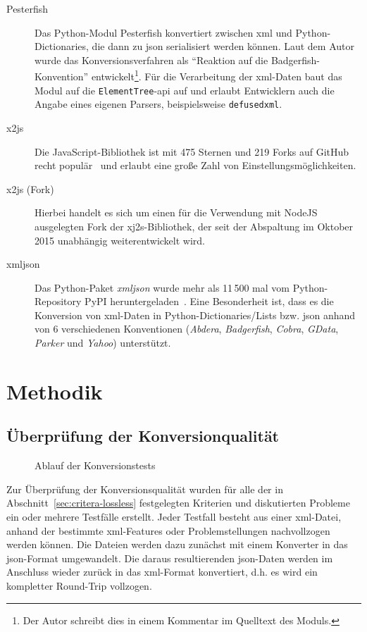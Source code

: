 \begin{description}
    \item[Pesterfish] Das Python-Modul Pesterfish konvertiert zwischen \acrshort{xml} und Python-\linebreak{}Dictionaries, die dann zu \acrshort{json} serialisiert werden können. Laut dem Autor wurde das Konversionsverfahren als \enquote{Reaktion auf die Badgerfish-Konvention} entwickelt\footnote{Der Autor schreibt dies in einem Kommentar im Quelltext des Moduls.}. Für die Verarbeitung der \acrshort{xml}-Daten baut das Modul auf die \texttt{ElementTree}-\acrshort{api} auf und erlaubt Entwicklern auch die Angabe eines eigenen Parsers, beispielsweise \texttt{defusedxml}.
    \item[x2js] Die JavaScript-Bibliothek ist mit 475 Sternen und 219 Forks auf GitHub recht populär~\cite{githubx2js} und erlaubt eine große Zahl von Einstellungsmöglichkeiten.
    \item[x2js (Fork)] Hierbei handelt es sich um einen für die Verwendung mit NodeJS ausgelegten Fork der xj2s-Bibliothek, der seit der Abspaltung im Oktober 2015 unabhängig weiterentwickelt wird.
    \item[xmljson] Das Python-Paket \emph{xmljson} wurde mehr als 11\,500 mal vom Python-Repository PyPI heruntergeladen~\cite{pypistats-xmljson}. Eine Besonderheit ist, dass es die Konversion von \acrshort{xml}-Daten in Python-Dictionaries/Lists bzw. \acrshort{json} anhand von 6 verschiedenen Konventionen (\emph{Abdera}, \emph{Badgerfish}, \emph{Cobra}, \emph{GData}, \emph{Parker} und \emph{Yahoo}) unterstützt.
\end{description}


\section{Methodik}
\label{sec:method}

\subsection{Überprüfung der Konversionqualität}
\label{sec:method-conv}

\begin{figure}[t]
    \begin{center}
        
        \caption{Ablauf der Konversionstests}
    \end{center}
\end{figure}

Zur Überprüfung der Konversionsqualität wurden für alle der in Abschnitt~\ref{sec:critera-lossless} festgelegten Kriterien und diskutierten Probleme ein oder mehrere Testfälle erstellt. Jeder Testfall besteht aus einer \acrshort{xml}-Datei, anhand der bestimmte \acrshort{xml}-Features oder Problemstellungen nachvollzogen werden können. Die Dateien werden dazu zunächst mit einem Konverter in das \acrshort{json}-Format umgewandelt. Die daraus resultierenden \acrshort{json}-Daten werden im Anschluss wieder zurück in das \acrshort{xml}-Format konvertiert, d.h. es wird ein kompletter Round-Trip vollzogen.

